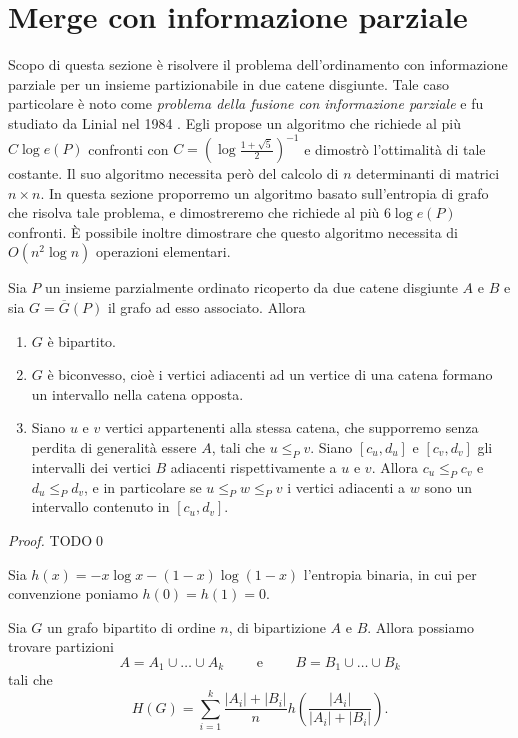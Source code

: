 \section{Merge con informazione parziale} Scopo di questa sezione \`e risolvere il problema dell'ordinamento con informazione parziale per un insieme partizionabile in due catene disgiunte. Tale caso particolare \`e noto come \emph{problema della fusione con informazione parziale} e fu studiato da Linial nel 1984 \cite{Linial1984}. Egli propose un algoritmo che richiede al pi\`u \(C\log{e(P)}\) confronti con \(C=\left(\log{\frac{1+\sqrt{5}}{2}}\right)^{-1}\) e dimostr\`o l'ottimalit\`a di tale costante. Il suo algoritmo necessita per\`o del calcolo di \(n\) determinanti di matrici \(n\times n\). In questa sezione proporremo un algoritmo basato sull'entropia di grafo che risolva tale problema, e dimostreremo che richiede al pi\`u \(6\log{e(P)}\) confronti. \`E possibile inoltre dimostrare che questo algoritmo necessita di \(O(n^2\log{n})\) operazioni elementari. 
\begin{lemma}
	\label{structurelemma} Sia \(P\) un insieme parzialmente ordinato ricoperto da due catene disgiunte \(A\) e \(B\) e sia \(G=\overline{G}(P)\) il grafo ad esso associato. Allora 
	\begin{enumerate}
		\item \(G\) è bipartito. 
		\item \(G\) è biconvesso, cio\`e i vertici adiacenti ad un vertice di una catena formano un intervallo nella catena opposta. 
		\item Siano \(u\) e \(v\) vertici appartenenti alla stessa catena, che supporremo senza perdita di generalità essere \(A\), tali che \(u\le_{P} v\). Siano \([c_u,d_u]\) e \([c_v,d_v]\) gli intervalli dei vertici \(B\) adiacenti rispettivamente a \(u\) e \(v\). Allora \(c_u\le_{P} c_v\) e \(d_u\le_{P} d_v\), e in particolare se \(u\le_{P}w\le_{P}v\) i vertici adiacenti a \(w\) sono un intervallo contenuto in \([c_u,d_v]\). 
	\end{enumerate}
\end{lemma}
\begin{proof}
	TODO\qed 
\end{proof}
Sia \(h(x)=-x\log{x}-(1-x)\log{(1-x)}\) l'entropia binaria, in cui per convenzione poniamo \(h(0)=h(1)=0\). 
\begin{theorem}
	 Sia \(G\) un grafo bipartito di ordine \(n\), di bipartizione \(A\) e \(B\). Allora possiamo trovare partizioni
	\[A=A_1\cup\dots\cup A_k\qquad\text{ e }\qquad B=B_1\cup\dots\cup B_k\]
	tali che
	\[H(G)=\sum_{i=1}^k{\frac{|A_i|+|B_i|}{n}h\left(\frac{|A_i|}{|A_i|+|B_i|}\right)}.\]
\end{theorem}

